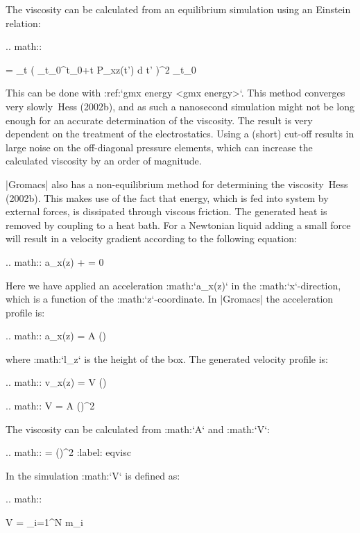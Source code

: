 The viscosity can be calculated from an equilibrium simulation using an
Einstein relation:

.. math::

   \eta =  \lim_{t \rightarrow \infty}
    \left\langle 
   \left( \int_{t_0}^{{t_0}+t} P_{xz}(t') \mbox{d} t' \right)^2
   \right\rangle_{t_0}

This can be done with :ref:`gmx energy <gmx energy>`. This method converges
very slowly Hess (2002b), and as such a nanosecond simulation might not
be long enough for an accurate determination of the viscosity. The
result is very dependent on the treatment of the electrostatics. Using a
(short) cut-off results in large noise on the off-diagonal pressure
elements, which can increase the calculated viscosity by an order of
magnitude.

|Gromacs| also has a non-equilibrium method for determining the
viscosity Hess (2002b). This makes use of the fact that energy, which is
fed into system by external forces, is dissipated through viscous
friction. The generated heat is removed by coupling to a heat bath. For
a Newtonian liquid adding a small force will result in a velocity
gradient according to the following equation:

.. math:: a_x(z) + \frac{\eta}{\rho}  = 0

Here we have applied an acceleration :math:`a_x(z)` in the
:math:`x`-direction, which is a function of the :math:`z`-coordinate. In
|Gromacs| the acceleration profile is:

.. math:: a_x(z) = A \cos\left(\right)

where :math:`l_z` is the height of the box. The generated velocity
profile is:

.. math:: v_x(z) = V \cos\left(\right)

.. math:: V = A \frac{\rho}{\eta}\left(\right)^2

The viscosity can be calculated from :math:`A` and :math:`V`:

.. math:: \eta = \rho \left(\right)^2
          :label: eqvisc

In the simulation :math:`V` is defined as:

.. math::

   V = 
            {\displaystyle \sum_{i=1}^N m_i}

